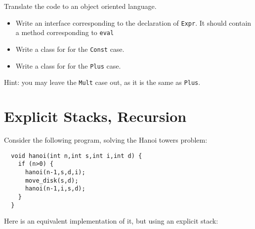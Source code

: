 \documentclass{article}
\newcommand{\answer}[1]{}
\begin{document}
Translate the code to an object oriented language.

\begin{itemize}
\item Write an interface corresponding to the declaration of \texttt{Expr}. It should contain a method corresponding to \texttt{eval} 
\item Write a class for for the \texttt{Const} case. 
\item Write a class for for the \texttt{Plus} case. 
\end{itemize}

Hint: you may leave the \texttt{Mult} case out, as it is the same as \texttt{Plus}.
\answer{
  \begin{verbatim}
    interface Expr { int eval(); }

    class Const implements Expr { int value; int eval() {return
        value;} }

    class Plus implements Expr { Expr l; Expr r; int eval() {return
        r.eval() + r.eval();}
    }
\end{verbatim}
}

\newpage

\section{Explicit Stacks, Recursion}

Consider the following program, solving the Hanoi towers problem:

\begin{verbatim}
  void hanoi(int n,int s,int i,int d) {
    if (n>0) {
      hanoi(n-1,s,d,i);
      move_disk(s,d);
      hanoi(n-1,i,s,d);
    }
  }
\end{verbatim}


Here is an equivalent implementation of it, but using an explicit
stack:
\end{document}

